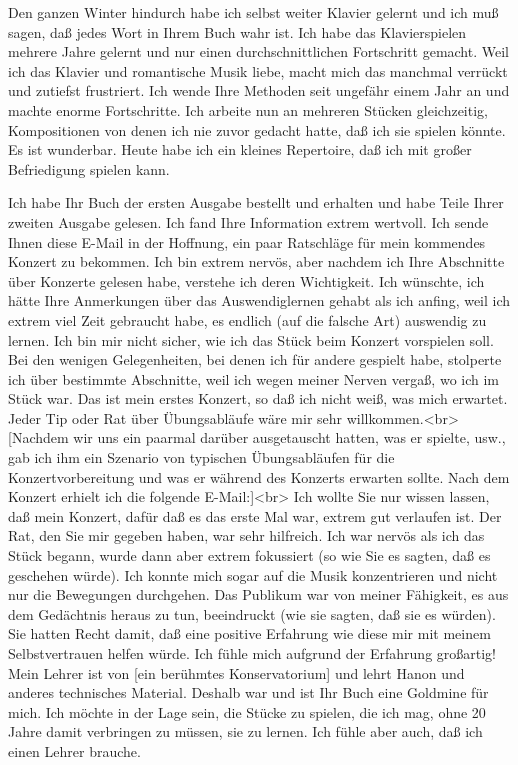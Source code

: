 \item \hypertarget{testimonials23}{}
Den ganzen Winter hindurch habe ich selbst weiter Klavier gelernt und ich muß sagen, daß jedes Wort in Ihrem Buch wahr ist.
Ich habe das Klavierspielen mehrere Jahre gelernt und nur einen durchschnittlichen Fortschritt gemacht.
Weil ich das Klavier und romantische Musik liebe, macht mich das manchmal verrückt und zutiefst frustriert.
Ich wende Ihre Methoden seit ungefähr einem Jahr an und machte enorme Fortschritte.
Ich arbeite nun an mehreren Stücken gleichzeitig, Kompositionen von denen ich nie zuvor gedacht hatte, daß ich sie spielen könnte.
Es ist wunderbar.
Heute habe ich ein kleines Repertoire, daß ich mit großer Befriedigung spielen kann.


\item \hypertarget{testimonials24}{}
Ich habe Ihr Buch der ersten Ausgabe bestellt und erhalten und habe Teile Ihrer zweiten Ausgabe gelesen.
Ich fand Ihre Information extrem wertvoll.
Ich sende Ihnen diese E-Mail in der Hoffnung, ein paar Ratschläge für mein kommendes Konzert zu bekommen.
Ich bin extrem nervös, aber nachdem ich Ihre Abschnitte über Konzerte gelesen habe, verstehe ich deren Wichtigkeit.
Ich wünschte, ich hätte Ihre Anmerkungen über das Auswendiglernen gehabt als ich anfing, weil ich extrem viel Zeit gebraucht habe, es endlich (auf die falsche Art) auswendig zu lernen.
Ich bin mir nicht sicher, wie ich das Stück beim Konzert vorspielen soll.
Bei den wenigen Gelegenheiten, bei denen ich für andere gespielt habe, stolperte ich über bestimmte Abschnitte, weil ich wegen meiner Nerven vergaß, wo ich im Stück war.
Das ist mein erstes Konzert, so daß ich nicht weiß, was mich erwartet.
Jeder Tip oder Rat über Übungsabläufe wäre mir sehr willkommen.<br>
[Nachdem wir uns ein paarmal darüber ausgetauscht hatten, was er spielte, usw., gab ich ihm ein Szenario von typischen Übungsabläufen für die Konzertvorbereitung und was er während des Konzerts erwarten sollte.
Nach dem Konzert erhielt ich die folgende E-Mail:]<br>
Ich wollte Sie nur wissen lassen, daß mein Konzert, dafür daß es das erste Mal war, extrem gut verlaufen ist.
Der Rat, den Sie mir gegeben haben, war sehr hilfreich.
Ich war nervös als ich das Stück begann, wurde dann aber extrem fokussiert (so wie Sie es sagten, daß es geschehen würde).
Ich konnte mich sogar auf die Musik konzentrieren und nicht nur die Bewegungen durchgehen.
Das Publikum war von meiner Fähigkeit, es aus dem Gedächtnis heraus zu tun, beeindruckt (wie sie sagten, daß sie es würden).
Sie hatten Recht damit, daß eine positive Erfahrung wie diese mir mit meinem Selbstvertrauen helfen würde.
Ich fühle mich aufgrund der Erfahrung großartig!
Mein Lehrer ist von [ein berühmtes Konservatorium] und lehrt Hanon und anderes technisches Material.
Deshalb war und ist Ihr Buch eine Goldmine für mich.
Ich möchte in der Lage sein, die Stücke zu spielen, die ich mag, ohne 20 Jahre damit verbringen zu müssen, sie zu lernen.
Ich fühle aber auch, daß ich einen Lehrer brauche.


